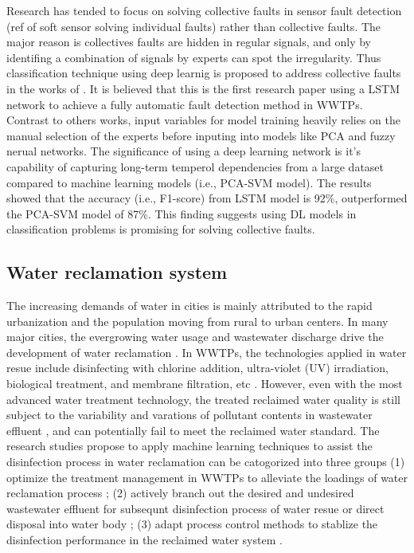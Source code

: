 Research has tended to focus on solving collective faults in sensor fault detection (ref of soft sensor solving individual faults) rather than collective faults. The major reason is collectives faults are hidden in regular signals, and only by identifing a combination of signals by experts can spot the irregularity. Thus classification technique using deep learnig is proposed to address collective faults in the works of \citet{mamandipoorMonitoringDetectingFaults2020}. It is believed that this is the first research paper using a LSTM network to achieve a fully automatic fault detection method in WWTPs. Contrast to others works, input variables for model training heavily relies on the manual selection of the experts before inputing into models like PCA and fuzzy nerual networks. The significance of using a deep learning network is it's capability of capturing long-term temperol dependencies from a large dataset compared to machine learning models (i.e., PCA-SVM model). The results showed that the accuracy (i.e., F1-score) from LSTM model is 92\%, outperformed the PCA-SVM model of 87\%. This finding suggests using DL models in classification problems is promising for solving collective faults.

\subsection{Water reclamation system}
The increasing demands of water in cities is mainly attributed to the rapid urbanization and the population moving from rural to urban centers. In many major cities, the evergrowing water usage and wastewater discharge drive the development of water reclamation \citep{lyuWastewaterReclamationReuse2016}. In WWTPs, the technologies applied in water resue include disinfecting with chlorine addition, ultra-violet (UV) irradiation, biological treatment, and membrane filtration, etc \citep{norton-brandaoReclamationUsedUrban2013}. However, even with the most advanced water treatment technology, the treated reclaimed water quality is still subject to the variability and varations of pollutant contents in wastewater effluent \citep{chenAssessingWastewaterReclamation2003}, and can potentially fail to meet the reclaimed water standard. The research studies propose to apply machine learning techniques to assist the disinfection process in water reclamation can be catogorized into three groups (1) optimize the treatment management in WWTPs to alleviate the loadings of water reclamation process \citep{al-ghazawiUseArtificialNeural2021,vietEnhancementMembraneSystem2021}; (2) actively branch out the desired and undesired wastewater effluent for subsequnt disinfection process of water resue or direct disposal into water body \citep{chenAssessingWastewaterReclamation2003}; (3) adapt process control methods to stablize the disinfection performance in the reclaimed water system \citep{demirFeedbackControlChlorine2014a}. 

